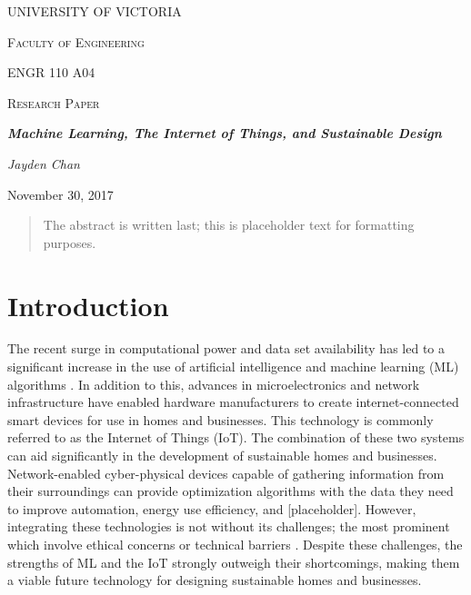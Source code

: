 \documentclass[letterpaper]{article}
\begin{document}
\begin{titlepage}
    \centering
    {\scshape\huge UNIVERSITY OF VICTORIA \par}
    \vspace{1cm}
    {\scshape\LARGE Faculty of Engineering \par\Large ENGR 110 A04\par}
    \vspace{1cm}
    {\scshape\Large Research Paper \par}
    \vspace{1.5cm}
    {\huge\bfseries \emph{Machine Learning, The Internet of Things, and Sustainable Design} \par}
    \vspace{2cm}
    {\Large\itshape Jayden Chan \par}
    \vfill
    {\large November 30, 2017\par}
\end{titlepage}

\pagestyle{customPage}

\begin{abstract}
    The abstract is written last; this is placeholder text for formatting purposes. \blindtext
\end{abstract}

\section{Introduction} \label{intro}
The recent surge in computational power and data set availability has led to a significant increase in the use of artificial intelligence and machine learning (ML) algorithms \cite{chan17}. In addition to this, advances in microelectronics and network infrastructure have enabled hardware manufacturers to create internet-connected smart devices for use in homes and businesses. This technology is commonly referred to as the Internet of Things (IoT). The combination of these two systems can aid significantly in the development of sustainable homes and businesses. Network-enabled cyber-physical devices capable of gathering information from their surroundings can provide optimization algorithms with the data they need to improve automation, energy use efficiency, and [placeholder]. However, integrating these technologies is not without its challenges; the most prominent which involve ethical concerns or technical barriers \cite{perisic16, mccalman17, vlacheas13}. Despite these challenges, the strengths of ML and the IoT strongly outweigh their shortcomings, making them a viable future technology for designing sustainable homes and businesses.
\end{document}
